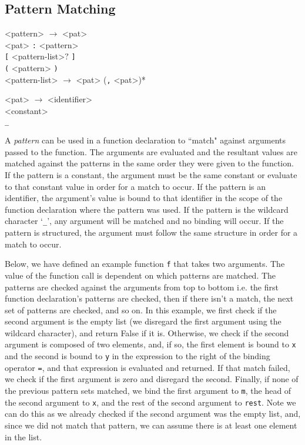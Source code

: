 \subsection{Pattern Matching}

\setlength{\grammarindent}{5em}
\begin{grammar}
<pattern> $\rightarrow$ <pat> \\ <pat> \texttt{:} <pattern> \\ \texttt{[} <pattern-list>$?$ \texttt{]} \\
												\texttt{(} <pattern> \texttt{)} \\


<pattern-list> $\rightarrow$ <pat> (\texttt{,} <pat>)* 

<pat> $\rightarrow$ <identifier> \\ <constant> \\ \texttt{_}
												
\end{grammar}

A \emph{pattern} can be used in a function declaration to ``match" against arguments passed to the function. The
arguments are evaluated and the resultant values are matched against the patterns in the same order they were given
to the function. If the pattern
is a constant, the argument must be the same constant or evaluate to that constant value in order for a match to
occur. If the pattern is an identifier, the argument's value is bound to that identifier in the scope of the
function declaration where the pattern was used. If the pattern is the wildcard character `\texttt{_}', 
any argument will be matched and no binding will occur. If the pattern is structured, the argument must follow
the same structure in order for a match to occur. 

Below, we have defined an example function \texttt{f} that takes two arguments. 
The value of the function call is dependent
on which patterns are matched. The patterns are checked against the arguments from top to bottom i.e. the first
function declaration's patterns are checked, then if there isn't a match, the next set of patterns are checked,
and so on. In this example, we first check if the second argument is the empty list (we disregard the first
argument using the wildcard character), and return False if it is. Otherwise, we check if the second argument
is composed of two elements, and, if so, the first element is bound to \texttt{x} and the second is bound to
\texttt{y} in the expression to the right of the binding operator \texttt{=}, and that expression is evaluated and
returned. If that match failed, we check if the first argument is zero and disregard the second. Finally, if
none of the previous pattern sets matched, we bind the first argument to \texttt{m}, the head of the
second argument to \texttt{x}, and the rest of the second argument to \texttt{rest}. Note we can do this
as we already checked if the second argument was the empty list, and, since we did not match that pattern,
we can assume there is at least one element in the list.

